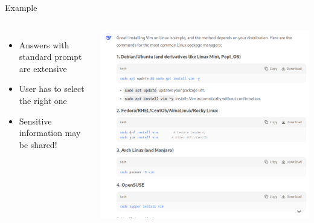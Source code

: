 \documentclass[aspectratio=169]{beamer}
\begin{document}
\begin{frame}[fragile]{Example}
\begin{columns}
\begin{itemize}
  \item Answers with standard prompt are extensive
  \item User has to select the right one
  \item Sensitive information may be shared!
\end{itemize}
  \includegraphics[width=\linewidth]{DeepSeek}
\end{columns}
\end{frame}
\end{document}
